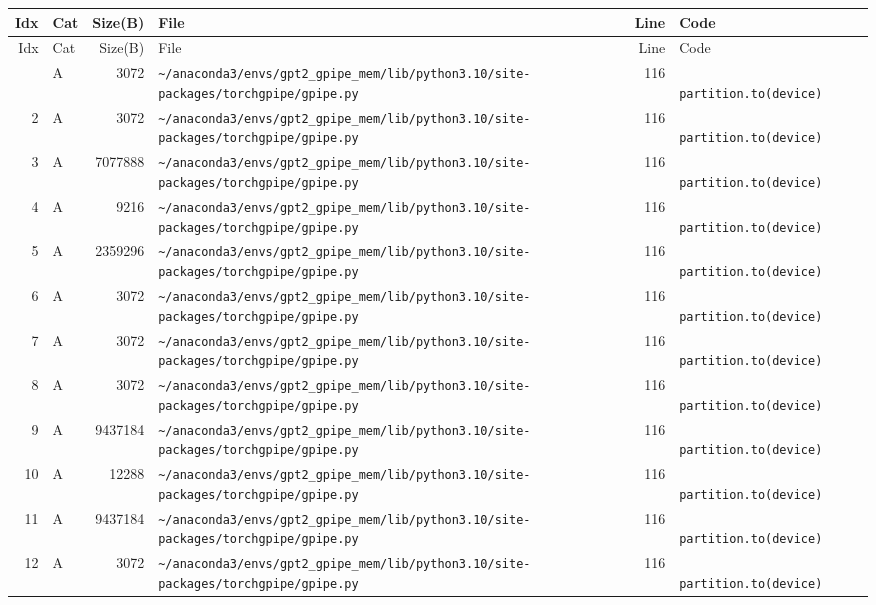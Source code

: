 \documentclass{article}
\begin{document}
\begin{longtable}{r l r p{6.5cm} r p{7.0cm}}
\hline
Idx & Cat & Size(B) & File & Line & Code \\
\hline
\endfirsthead
\hline
Idx & Cat & Size(B) & File & Line & Code \\
\hline
\endhead
\hline
\endfoot
1 & A & 3072 & \lstinline|~/anaconda3/envs/gpt2_gpipe_mem/lib/python3.10/site-packages/torchgpipe/gpipe.py| & 116 & \lstinline|            partition.to(device)| \\
2 & A & 3072 & \lstinline|~/anaconda3/envs/gpt2_gpipe_mem/lib/python3.10/site-packages/torchgpipe/gpipe.py| & 116 & \lstinline|            partition.to(device)| \\
3 & A & 7077888 & \lstinline|~/anaconda3/envs/gpt2_gpipe_mem/lib/python3.10/site-packages/torchgpipe/gpipe.py| & 116 & \lstinline|            partition.to(device)| \\
4 & A & 9216 & \lstinline|~/anaconda3/envs/gpt2_gpipe_mem/lib/python3.10/site-packages/torchgpipe/gpipe.py| & 116 & \lstinline|            partition.to(device)| \\
5 & A & 2359296 & \lstinline|~/anaconda3/envs/gpt2_gpipe_mem/lib/python3.10/site-packages/torchgpipe/gpipe.py| & 116 & \lstinline|            partition.to(device)| \\
6 & A & 3072 & \lstinline|~/anaconda3/envs/gpt2_gpipe_mem/lib/python3.10/site-packages/torchgpipe/gpipe.py| & 116 & \lstinline|            partition.to(device)| \\
7 & A & 3072 & \lstinline|~/anaconda3/envs/gpt2_gpipe_mem/lib/python3.10/site-packages/torchgpipe/gpipe.py| & 116 & \lstinline|            partition.to(device)| \\
8 & A & 3072 & \lstinline|~/anaconda3/envs/gpt2_gpipe_mem/lib/python3.10/site-packages/torchgpipe/gpipe.py| & 116 & \lstinline|            partition.to(device)| \\
9 & A & 9437184 & \lstinline|~/anaconda3/envs/gpt2_gpipe_mem/lib/python3.10/site-packages/torchgpipe/gpipe.py| & 116 & \lstinline|            partition.to(device)| \\
10 & A & 12288 & \lstinline|~/anaconda3/envs/gpt2_gpipe_mem/lib/python3.10/site-packages/torchgpipe/gpipe.py| & 116 & \lstinline|            partition.to(device)| \\
11 & A & 9437184 & \lstinline|~/anaconda3/envs/gpt2_gpipe_mem/lib/python3.10/site-packages/torchgpipe/gpipe.py| & 116 & \lstinline|            partition.to(device)| \\
12 & A & 3072 & \lstinline|~/anaconda3/envs/gpt2_gpipe_mem/lib/python3.10/site-packages/torchgpipe/gpipe.py| & 116 & \lstinline|            partition.to(device)| \\

\end{longtable}
\end{document}
